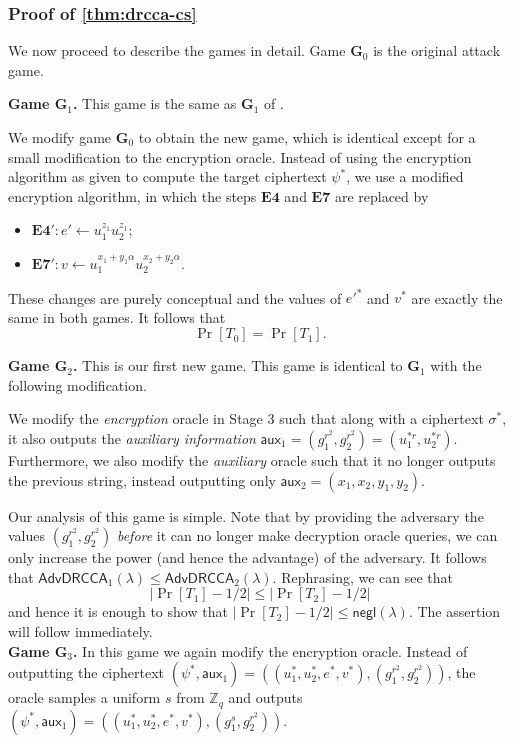 \documentclass[10pt,a4paper]{article}
\newcommand{\negl}{\mathsf{negl}}
\newcommand{\aux}{\mathsf{aux}}
\newcommand{\drcca}{\mathsf{AdvDRCCA}}
\newcommand{\game}{\mathbf{G}}
\newcommand{\estep}[1]{\mathbf{E#1}}
\begin{document}
	\subsubsection{Proof of \cref{thm:drcca-cs}}

	We now proceed to describe the games in detail. Game $\game_0$ is the original attack game.
	
	\textbf{Game $\game_1$.} This game is the same as $\game_1$ of \cite{cs01}. 
	
	We modify game $\game_0$ to obtain the new game, which is identical except for a small modification to the encryption oracle. Instead of using the encryption algorithm as given to compute the target ciphertext $\psi^{*}$, we use a modified encryption algorithm, in which the steps $\estep{4}$ and $\estep{7}$ are replaced by 
	\begin{itemize}
		\item[] $\estep{4}': e'\gets u_1^{z_1}u_2^{z_1}$;
		\item[] $\estep{7}': v\gets u_1^{x_1+y_1\alpha}u_2^{x_2+y_2\alpha}$.
	\end{itemize}
	These changes are purely conceptual and the values of $e'^{*}$ and $v^{*}$ are exactly the same in both games. It follows that $$\Pr[T_0]=\Pr[T_1].$$
	
	\textbf{Game $\game_2$.} This is our first new game. This game is identical to $\game_1$ with the following modification.
	
	We modify the \textit{encryption} oracle in Stage $3$ such that along with a ciphertext $\sigma^{*}$, it also outputs the \textit{auxiliary information} $\aux_1 = (g_1^{r^2}, g_2^{r^2}) = (u_1^{*r}, u_2^{*r})$. Furthermore, we also modify the \textit{auxiliary} oracle such that it no longer outputs the previous string, instead outputting only $\aux_2 = (x_1,x_2,y_1,y_2)$. 
	
	Our analysis of this game is simple. Note that by providing the adversary the values $(g_1^{r^2}, g_2^{r^2})$ \textit{before} it can no longer make decryption oracle queries, we can only increase the power (and hence the advantage) of the adversary. It follows that $\drcca_1(\lambda)\leq\drcca_2(\lambda)$. Rephrasing, we can see that $$|\Pr[T_1]-1/2|\leq|\Pr[T_2]-1/2|$$ and hence it is enough to show that $|\Pr[T_2]-1/2|\leq\negl(\lambda)$. The assertion will follow immediately.\\
	
	\textbf{Game $\game_3$.} In this game we again modify the encryption oracle. Instead of outputting the ciphertext $(\psi^{*}, \aux_1) = ((u_1^{*}, u_2^{*}, e^{*}, v^{*}), (g_1^{r^2}, g_2^{r^2}))$, the oracle samples a uniform $s$ from $\mathbb{Z}_{q}$ and outputs $(\psi^{*}, \aux_1) = ((u_1^{*}, u_2^{*}, e^{*}, v^{*}), (g_1^{s}, g_2^{r^2}))$. 
	
\end{document}
